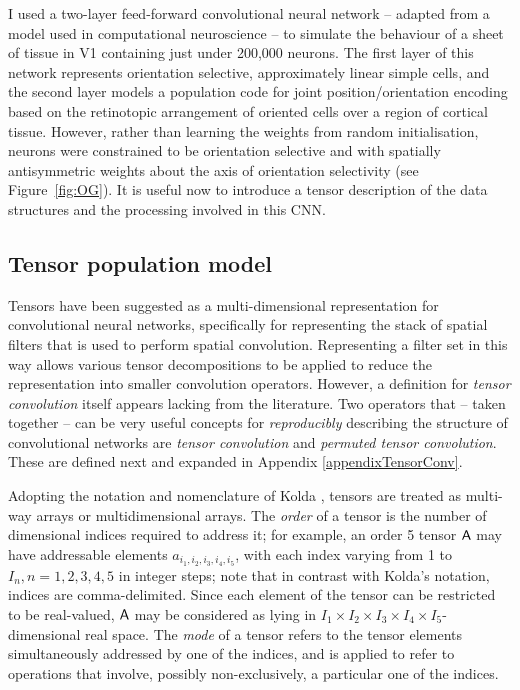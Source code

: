 I used a two-layer feed-forward convolutional neural network -- adapted from a model used in computational neuroscience -- to simulate the behaviour of a sheet of tissue in V1 containing just under 200,000 neurons. The first layer of this network represents orientation selective, approximately linear simple cells, and the second layer models a population code for joint position/orientation encoding based on the retinotopic arrangement of oriented cells over a region of cortical tissue.  However, rather than learning the weights from random initialisation, neurons were constrained to be orientation selective and with spatially antisymmetric weights about the axis of orientation selectivity (see Figure~\ref{fig:OG}). It is useful now to introduce a tensor description of the data structures and the processing involved in this CNN.

\subsection{Tensor population model}
Tensors have been suggested as a multi-dimensional representation for convolutional neural networks, specifically for representing the stack of spatial filters that is used to perform spatial convolution. Representing a filter set in this way allows various tensor decompositions to be applied \cite{kolda2009tensor} to reduce the representation into smaller convolution operators. However, a definition for \textit{tensor convolution} itself appears lacking from the literature. Two operators that -- taken together -- can be very useful concepts for \textit{reproducibly} describing the structure of convolutional networks are \textit{tensor convolution} and \textit{permuted tensor convolution}. These are defined next and expanded in Appendix \ref{appendixTensorConv}.

Adopting the notation and nomenclature of Kolda \cite{kolda2009tensor}, tensors are treated as multi-way arrays or multidimensional arrays. The  \textit{order} of a tensor is the number of dimensional indices required to address it; for example, an order 5 tensor $\mathsf{A}$ may have addressable elements $a_{i_1,i_2,i_3,i_4,i_5}$, with each index varying from 1 to $I_n, n = 1,2,3,4,5$ in integer steps; note that in contrast with Kolda's notation, indices are comma-delimited.  Since each element of the tensor can be restricted to be real-valued, $\mathsf{A}$ may be considered as lying in $I_1\times I_2\times I_3 \times I_4 \times I_5$- dimensional real space. The \textit{mode} of a tensor refers to the tensor elements simultaneously addressed by one of the indices, and is applied to refer to operations that involve, possibly non-exclusively, a particular one of the indices. 

